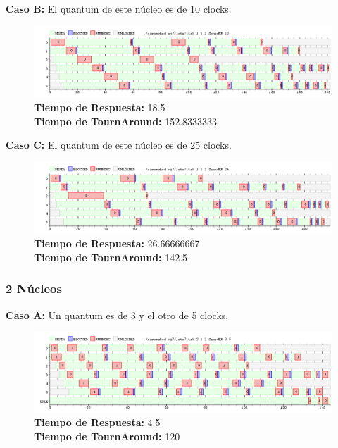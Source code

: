 \documentclass[a4paper]{article}
\begin{document}
	
	\textbf{Caso B:} El quantum de este n\'ucleo es de 10 clocks.
	
		 \begin{figure}[h!]
   \begin{center}
 	\includegraphics[scale=0.5]{imagenes/ej7/1nucleoB.png}
 	\textbf{Tiempo de Respuesta:} 18.5 \\
 	\textbf{Tiempo de TournAround:} 152.8333333\\
   \end{center}
 \end{figure} 
	
	\textbf{Caso C:} El quantum de este n\'ucleo es de 25 clocks.

		 \begin{figure}[h!]
   \begin{center}
 	\includegraphics[scale=0.5]{imagenes/ej7/1nucleoC.png}
 	\textbf{Tiempo de Respuesta:} 26.66666667 \\
 	\textbf{Tiempo de TournAround:} 142.5 \\
   \end{center}
 \end{figure} 	
	
\newpage	
	\subsubsection*{2 N\'ucleos}
	
	\textbf{Caso A:} Un quantum es de 3 y el otro de 5 clocks.

		 \begin{figure}[h!]
   \begin{center}
 	\includegraphics[scale=0.5]{imagenes/ej7/2nucleoA.png}
 	\textbf{Tiempo de Respuesta:} 4.5 \\
 	\textbf{Tiempo de TournAround:} 120 \\
   \end{center}
 \end{figure} 
 	
\end{document}
